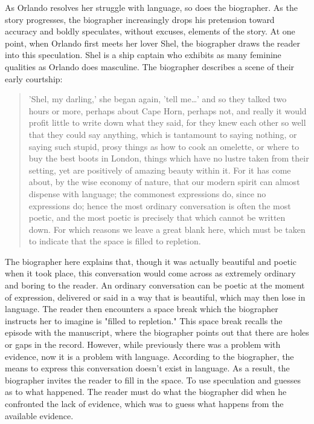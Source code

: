 \documentclass[11pt]{article}
\begin{document}
As Orlando resolves her struggle with language, so does the
biographer. As the story progresses, the biographer increasingly drops
his pretension toward accuracy and boldly speculates, without excuses,
elements of the story. At one point, when Orlando first meets her
lover Shel, the biographer draws the reader into this
speculation. Shel is a ship captain who exhibits as many feminine
qualities as Orlando does masculine. The biographer describes a scene
of their early courtship:
\begin{quote}
'Shel, my darling,' she began again, 'tell me\ldots{}' and so they talked
two hours or more, perhaps about Cape Horn, perhaps not, and really it
would profit little to write down what they said, for they knew each
other so well that they could say anything, which is tantamount to
saying nothing, or saying such stupid, prosy things as how to cook an
omelette, or where to buy the best boots in London, things which have
no lustre taken from their setting, yet are positively of amazing
beauty within it. For it has come about, by the wise economy of
nature, that our modern spirit can almost dispense with language; the
commonest expressions do, since no expressions do; hence the most
ordinary conversation is often the most poetic, and the most poetic is
precisely that which cannot be written down. For which reasons we
leave a great blank here, which must be taken to indicate that the
space is filled to repletion.
\end{quote}
The biographer here explains that, though it was actually beautiful
and poetic when it took place, this conversation would come across as
extremely ordinary and boring to the reader. An ordinary conversation
can be poetic at the moment of expression, delivered or said in a way
that is beautiful, which may then lose in language. The reader then
encounters a space break which the biographer instructs her to imagine
is "filled to repletion." This space break recalls the episode with
the manuscript, where the biographer points out that there are holes
or gaps in the record. However, while previously there was a problem
with evidence, now it is a problem with language. According to the
biographer, the means to express this conversation doesn’t exist in
language. As a result, the biographer invites the reader to fill in
the space. To use speculation and guesses as to what happened. The
reader must do what the biographer did when he confronted the lack of
evidence, which was to guess what happens from the available evidence.
\end{document}

